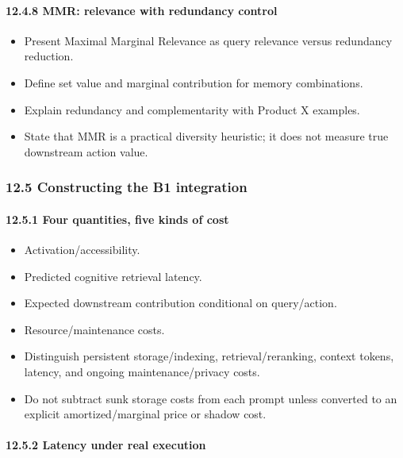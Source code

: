\paragraph{12.4.8 MMR: relevance with redundancy control}\label{1248-mmr-relevance-with-redundancy-control}

\begin{itemize}
\tightlist
\item
  Present Maximal Marginal Relevance as query relevance versus redundancy reduction.
\item
  Define set value and marginal contribution for memory combinations.
\item
  Explain redundancy and complementarity with Product X examples.
\item
  State that MMR is a practical diversity heuristic; it does not measure true downstream action value.
\end{itemize}

\subsubsection{12.5 Constructing the B1 integration}\label{125-constructing-the-b1-integration}

\paragraph{12.5.1 Four quantities, five kinds of cost}\label{1251-four-quantities-five-kinds-of-cost}

\begin{itemize}
\tightlist
\item
  Activation/accessibility.
\item
  Predicted cognitive retrieval latency.
\item
  Expected downstream contribution conditional on query/action.
\item
  Resource/maintenance costs.
\item
  Distinguish persistent storage/indexing, retrieval/reranking, context tokens, latency, and ongoing maintenance/privacy costs.
\item
  Do not subtract sunk storage costs from each prompt unless converted to an explicit amortized/marginal price or shadow cost.
\end{itemize}

\paragraph{12.5.2 Latency under real execution}\label{1252-latency-under-real-execution}

